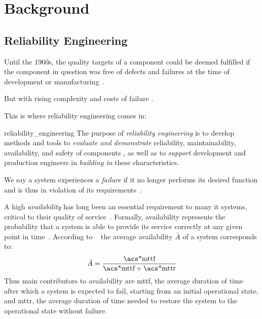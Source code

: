 \chapter{Background}\label{ch:background}

\acresetall


\section{Reliability Engineering}


Until the 1960s,
the quality targets of a component could be deemed fulfilled
if the component in question was free of defects and failures
at the time of development or manufacturing~\parencite[1]{reliability_engineering}.

But with rising complexity and costs of failure
.

This is where reliability engineering comes in:
\begin{displaycquote}[1]{reliability_engineering}
The purpose of \emph{reliability \textelp{} engineering} is to develop methods and tools to
\emph{evaluate and demonstrate} reliability, maintainability, availability, and safety of components
\textelp{},
as well as to \emph{support} development and production engineers in \emph{building in} these characteristics.
\end{displaycquote}
We say a system experiences a \emph{failure}
if it no longer performs its desired function and is thus in violation of its requirements~\parencite[3]{reliability_engineering}.

A high \emph{availability} has long been an essential requirement to many \ac{it} systems, critical to their quality of service~\parencite{high_availability}.
Formally, availability represents the probability that a system is able to provide its service correctly at any given point in time~\parencite{dependability}.
According to \citeauthor*{reliability_engineering}~\parencite[9]{reliability_engineering}
the average availability \(\bar{A}\) of a system corresponds to:
\begin{equation}
\bar{A} = \frac{\text{\acs*{mttf}}}{\text{\acs*{mttf}} + \text{\acs*{mttr}}}
\end{equation}
Thus main contributors to availability are \ac{mttf},
the average duration of time after which a system is expected to fail, starting from an initial operational state,
and \ac{mttr},
the average duration of time needed to restore the system to the operational state without failure.

